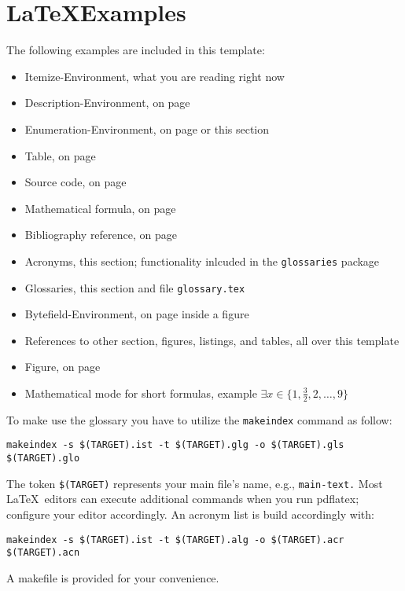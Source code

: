 \section{\LaTeX Examples}

The following examples are included in this template:
\begin{itemize}
    \item Itemize-Environment, what you are reading right now
	\item Description-Environment, on page \pageref{example:description}
	\item Enumeration-Environment, on page \pageref{example:enumeration} or this section
	\item Table, on page \pageref{tab:table}
	\item Source code, on page \pageref{lst:useless}
	\item Mathematical formula, on page \pageref{eqn:formula}
	\item Bibliography reference, on page \pageref{example:reference}
	\item Acronyms, this section; functionality inlcuded in the \texttt{glossaries} package
	\item Glossaries, this section and file \texttt{glossary.tex}
	\item Bytefield-Environment, on page \pageref{fig:bytefield} inside a figure
	\item References to other section, figures, listings, and tables, all over this template
	\item Figure, on page \pageref{fig:smiley}
	\item Mathematical mode for short formulas, example $\exists x \in \{1,\frac{3}{2},2,\ldots,9\}$
\end{itemize}

To make use the glossary you have to utilize the \texttt{makeindex} command as follow:
\begin{verbatim}
makeindex -s $(TARGET).ist -t $(TARGET).glg -o $(TARGET).gls $(TARGET).glo
\end{verbatim}
The token \texttt{\$(TARGET)} represents your main file's name, e.g., \texttt{main-text.}
Most \LaTeX\ editors can execute additional commands when you run \gls{pdflatex}; configure your editor accordingly.
An acronym list is build accordingly with:
\begin{verbatim}
makeindex -s $(TARGET).ist -t $(TARGET).alg -o $(TARGET).acr $(TARGET).acn
\end{verbatim}
A makefile is provided for your convenience.

